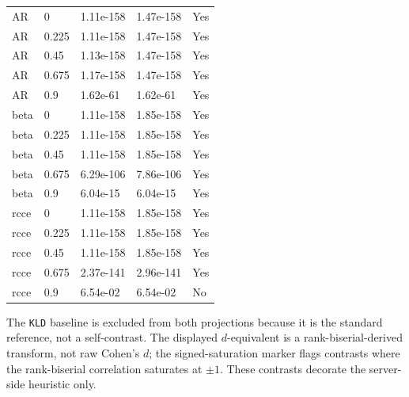 \documentclass[
  english,
]{article}
\theoremstyle{plain}
\theoremstyle{definition}
\theoremstyle{remark}
\theoremstyle{definition}
\begin{document}
\begin{longtable}[]{@{}lllll@{}}
AR & 0 & 1.11e-158 & 1.47e-158 & Yes \\
AR & 0.225 & 1.11e-158 & 1.47e-158 & Yes \\
AR & 0.45 & 1.13e-158 & 1.47e-158 & Yes \\
AR & 0.675 & 1.17e-158 & 1.47e-158 & Yes \\
AR & 0.9 & 1.62e-61 & 1.62e-61 & Yes \\
beta & 0 & 1.11e-158 & 1.85e-158 & Yes \\
beta & 0.225 & 1.11e-158 & 1.85e-158 & Yes \\
beta & 0.45 & 1.11e-158 & 1.85e-158 & Yes \\
beta & 0.675 & 6.29e-106 & 7.86e-106 & Yes \\
beta & 0.9 & 6.04e-15 & 6.04e-15 & Yes \\
rcce & 0 & 1.11e-158 & 1.85e-158 & Yes \\
rcce & 0.225 & 1.11e-158 & 1.85e-158 & Yes \\
rcce & 0.45 & 1.11e-158 & 1.85e-158 & Yes \\
rcce & 0.675 & 2.37e-141 & 2.96e-141 & Yes \\
rcce & 0.9 & 6.54e-02 & 6.54e-02 & No \\
\end{longtable}

The \texttt{KLD} baseline is excluded from both projections because it
is the standard reference, not a self-contrast. The displayed
\(d\)-equivalent is a rank-biserial-derived transform, not raw Cohen's
\(d\); the signed-saturation marker flags contrasts where the
rank-biserial correlation saturates at \(\pm1\). These contrasts
decorate the server-side  heuristic only.
\end{document}
